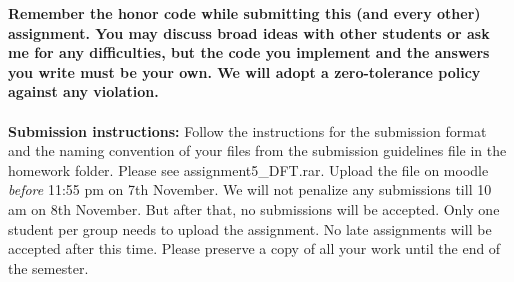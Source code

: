 \documentclass[11pt]{article}
\begin{document}
\maketitle

\textbf{Remember the honor code while submitting this (and every other) assignment. You may discuss broad ideas with other students or ask me for any difficulties, but the code you implement and the answers you write must be your own. We will adopt a \textbf{zero-tolerance policy} against any violation.}
\\
\\
\textbf{Submission instructions:} Follow the instructions for the submission format and the naming convention of your files from the submission guidelines file in the homework folder. Please see \textsf{assignment5\_DFT.rar}. Upload the file on moodle \emph{before} 11:55 pm on 7th November. We will not penalize any submissions till 10 am on 8th November. But after that, no submissions will be accepted. Only one student per group needs to upload the assignment. No late assignments will be accepted after this time. Please preserve a copy of all your work until the end of the semester.  
\end{document}
